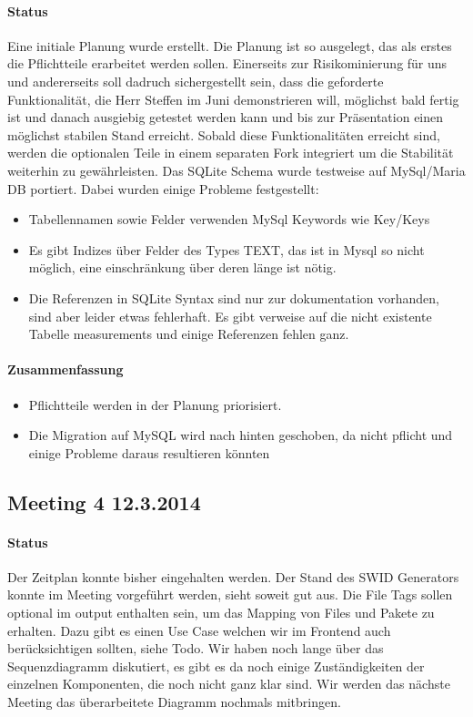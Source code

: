 \paragraph{Status}
Eine initiale Planung wurde erstellt. Die Planung ist so ausgelegt, das als erstes die Pflichtteile erarbeitet werden sollen. Einerseits zur Risikominierung für uns und andererseits soll dadruch sichergestellt sein, dass die geforderte Funktionalität,  die Herr Steffen im Juni demonstrieren will, möglichst bald fertig ist und danach ausgiebig getestet werden kann und bis zur Präsentation einen möglichst stabilen Stand erreicht. Sobald diese Funktionalitäten erreicht sind, werden die optionalen Teile in einem separaten Fork integriert um die Stabilität weiterhin zu gewährleisten.
Das SQLite Schema wurde testweise auf MySql/Maria DB portiert. Dabei wurden einige Probleme festgestellt:
\begin{itemize}
\item Tabellennamen sowie Felder verwenden MySql Keywords wie Key/Keys
\item Es gibt Indizes über Felder des Types TEXT, das ist in Mysql so nicht möglich, eine einschränkung über deren länge ist nötig.
\item Die Referenzen in SQLite Syntax sind nur zur dokumentation vorhanden, sind aber leider etwas fehlerhaft. Es gibt verweise auf die nicht existente Tabelle measurements und einige Referenzen fehlen ganz. 
\end{itemize}

\paragraph{Zusammenfassung}

\begin{itemize}
\item Pflichtteile werden in der Planung priorisiert.
\item Die Migration auf MySQL wird nach hinten geschoben, da nicht pflicht und einige Probleme daraus resultieren könnten
\end{itemize}
\subsection{Meeting 4 12.3.2014}
\paragraph{Status}
Der Zeitplan konnte bisher eingehalten werden. Der Stand des SWID Generators konnte im Meeting vorgeführt werden, sieht soweit gut aus. 
Die File Tags sollen optional im output enthalten sein, um das Mapping von Files und Pakete zu erhalten. Dazu gibt es einen Use Case welchen wir im Frontend auch berücksichtigen sollten, siehe Todo. Wir haben noch lange über das Sequenzdiagramm diskutiert, es gibt es da noch einige Zuständigkeiten der einzelnen Komponenten, die noch nicht ganz klar sind. Wir werden das nächste Meeting das überarbeitete Diagramm nochmals mitbringen.

